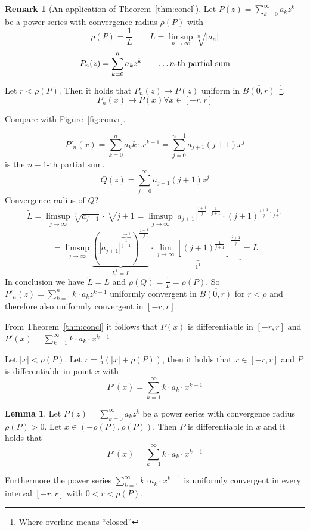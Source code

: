 \documentclass[a4paper,landscape,twocolumn]{article}
\theoremstyle{definition}
\newtheorem{rem}{Remark}
\newtheorem{lemma}{Lemma}
\newcommand\abs[1]{\left|#1\right|}
\begin{document}
\begin{rem}[An application of Theorem~\ref{thm:concl}]
  Let $P(z) = \sum_{k=0}^\infty a_k z^k$ be a power series with convergence radius $\rho(P)$ with
  \[ \rho(P) = \frac1L \qquad L = \limsup_{n\to\infty} \sqrt[n]{\abs{a_n}} \]
  \[ P_n(z) = \sum_{k=0}^n a_k z^k \qquad \text{\dots $n$-th partial sum} \]
  Let $r < \rho(P)$. Then it holds that $P_n(z) \to P(z)$ uniform in $\overline{B(0,r)}$~\footnote{Where overline means \enquote{closed}}.
  \[ P_n(x) \to P(x) \forall x \in [-r, r] \]

  Compare with Figure~\ref{fig:convr}.

  \[ P'_n(x) = \sum_{k=0}^n a_k k \cdot x^{k-1} = \sum_{j=0}^{n-1} a_{j+1} (j + 1) x^j \]
  is the $n-1$-th partial sum.
  \[ Q(z) = \sum_{j=0}^\infty a_{j+1} (j + 1) z^j \]
  Convergence radius of $Q$?
  \[ \tilde{L} = \limsup_{j\to\infty} \sqrt[j]{a_{j+1}} \cdot \sqrt[j]{j + 1} = \limsup_{j \to \infty} \abs{a_{j+1}}^{\frac{j+1}{j} \cdot \frac{1}{j+1}} \cdot (j+1)^{\frac{j+1}{j} \cdot \frac{1}{j+1}} \]
  \[
    = \limsup_{j\to\infty} \underbrace{\left(\abs{a_{j+1}}^{\overbrace{\frac{1}{j+1}}^{\to 1}}\right)^{\frac{j+1}{j}}}_{L^1 = L}
    \cdot \underbrace{\lim_{j\to\infty} \left[(j+1)^{\frac{1}{j+1}}\right]^{\frac{j+1}{j}}}_{1^1}
    = L
  \]
  In conclusion we have $\tilde L = L$ and $\rho(Q) = \frac1{L} = \rho(P)$.
  So $P'_n(z) = \sum_{k=1}^n k \cdot a_k z^{k-1}$ uniformly convergent in $\overline{B(0,r)}$ for $r<\rho$
  and therefore also uniformly convergent  in $[-r,r]$.

  From Theorem~\ref{thm:concl} it follows that $P(x)$ is differentiable
  in $[-r,r]$ and $P'(x) = \sum_{k=1}^\infty k \cdot a_k \cdot x^{k-1}$.

  Let $\abs{x} < \rho(P)$. Let $r = \frac12 (\abs{x} + \rho(P))$, then it holds that
  $x \in [-r, r]$ and $P$ is differentiable in point $x$ with
  \[ P'(x) = \sum_{k=1}^\infty k \cdot a_k \cdot x^{k-1} \]
\end{rem}

\begin{lemma}
  Let $P(z) = \sum_{k=0}^\infty a_k z^k$ be a power series with convergence radius $\rho(P) > 0$.
  Let $x \in (-\rho(P), \rho(P))$. Then $P$ is differentiable in $x$ and it holds that
  \[ P'(x) = \sum_{k=1}^\infty k \cdot a_k \cdot x^{k-1} \]

  Furthermore the power series $\sum_{k=1}^\infty k \cdot a_k \cdot x^{k-1}$ is uniformly convergent
  in every interval $[-r, r]$ with $0 < r < \rho(P)$.
\end{lemma}
\end{document}
